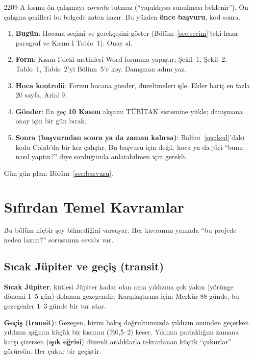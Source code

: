 \documentclass[11pt,a4paper]{article}
\begin{document}
\begin{basit}
2209-A formu ön çalışmayı \emph{zorunlu} tutmaz (“yapıldıysa sunulması beklenir”). Ön çalışma şekilleri bu belgede
zaten hazır. Bu yüzden \textbf{önce başvuru}, kod sonra.
\begin{enumerate}[leftmargin=*]
\item \textbf{Bugün}: Hocana seçimi ve gerekçesini göster (Bölüm~\ref{sec:secim}'teki hazır paragraf ve Kısım I Tablo~1). Onay al.
\item \textbf{Form}: Kısım I'deki metinleri Word formuna yapıştır; Şekil~1, Şekil~2, Tablo~1, Tablo~2'yi Bölüm~5'e koy.
      Danışman adını yaz.
\item \textbf{Hoca kontrolü}: Formu hocana gönder, düzeltmeleri işle. Ekler hariç en fazla 20 sayfa, Arial 9.
\item \textbf{Gönder}: En geç \textbf{10 Kasım} akşamı TÜBİTAK sistemine yükle; danışmana onay için bir gün bırak.
\item \textbf{Sonra (başvurudan sonra ya da zaman kalırsa)}: Bölüm~\ref{sec:kod}'daki kodu Colab'da bir kez çalıştır.
      Bu başvuru için değil, hoca ya da jüri “bunu nasıl yaptın?” diye sorduğunda anlatabilmen için gerekli.
\end{enumerate}
Gün gün plan: Bölüm~\ref{sec:basvuru}.
\end{basit}

\section{Sıfırdan Temel Kavramlar}
\label{sec:kavram}

Bu bölüm hiçbir şey bilmediğini varsayar. Her kavramın yanında “bu projede neden lazım?” sorusunun cevabı var.

\subsection{Sıcak Jüpiter ve geçiş (transit)}
\textbf{Sıcak Jüpiter}, kütlesi Jüpiter kadar olan ama yıldızına çok yakın (yörünge dönemi 1–5 gün) dolanan
gezegendir. Karşılaştırma için: Merkür 88 günde, bu gezegenler 1–3 günde bir tur atar.

\textbf{Geçiş (transit)}: Gezegen, bizim bakış doğrultumuzda yıldızın önünden geçerken yıldızın ışığının küçük bir
kısmını (\%0,5–2) keser. Yıldızın parlaklığını zamana karşı çizersen (\textbf{ışık eğrisi}) düzenli aralıklarla
tekrarlanan küçük “çukurlar” görürsün. Her çukur bir geçiştir.
\end{document}
